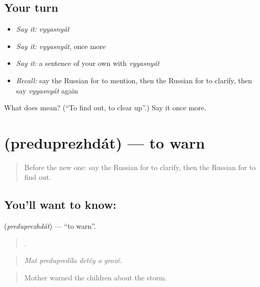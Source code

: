 \subsection*{Your turn}
\begin{itemize}
\raggedright
  \item \emph{Say it:} \emph{vyyasnyát}
  \item \emph{Say it:} \emph{vyyasnyát}, once more
  \item \emph{Say it:} a sentence of your own with \emph{vyyasnyát}
  \item \emph{Recall:} say the Russian for to mention, then the Russian for to clarify, then say \emph{vyyasnyát} again
\end{itemize}

\begin{tcolorbox}[breakable,colback=teal!4,colframe=teal!35!black,title={Before you move on}]
What does  mean? (\textquotedblleft{}To find out, to clear up\textquotedblright{}.) Say it once more.
\end{tcolorbox}
\section[\texorpdfstring{\ru{предупреждать} (preduprezhdát)}{предупреждать (preduprezhdát)}]{ (preduprezhdát) — to warn}

\label{lesson:RU-C283-preduprezhdat}



\begin{quote}
Before the new one: say the Russian for to clarify, then the Russian for to find out.
\end{quote}

\subsection*{You'll want to know: }
\textbf{} (\emph{preduprezhdát}) — \textquotedblleft{}to warn\textquotedblright{}.

\begin{quote}
    .
\end{quote}

\begin{quote}
\emph{Mat predupredíla detéy o grozé.}
\end{quote}

\begin{quote}
Mother warned the children about the storm.
\end{quote}

